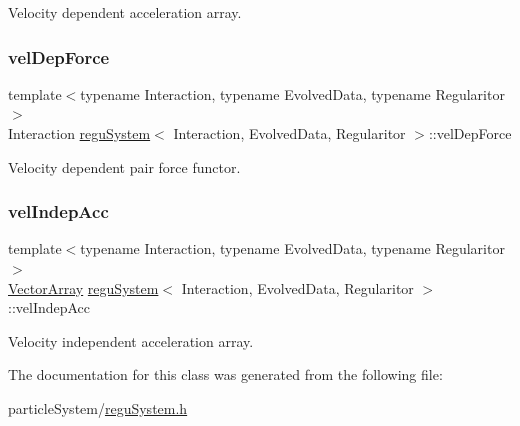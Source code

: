 Velocity dependent acceleration array. 

\mbox{\label{classregu_system_a9361c6c64c946570d6a71e3ab6ba74a0}} 
\subsubsection{\texorpdfstring{vel\+Dep\+Force}{velDepForce}}
{\footnotesize\ttfamily template$<$typename Interaction, typename Evolved\+Data, typename Regularitor$>$ \\
Interaction \mbox{\hyperlink{classregu_system}{regu\+System}}$<$ Interaction, Evolved\+Data, Regularitor $>$\+::vel\+Dep\+Force\hspace{0.3cm}{\ttfamily [private]}}



Velocity dependent pair force functor. 

\mbox{\label{classregu_system_afafcbf5f0c994cfe62d9fb8fb51023ab}} 
\subsubsection{\texorpdfstring{vel\+Indep\+Acc}{velIndepAcc}}
{\footnotesize\ttfamily template$<$typename Interaction, typename Evolved\+Data, typename Regularitor$>$ \\
\mbox{\hyperlink{classregu_system_aa4ecefb5c437230b994171e231450be8}{Vector\+Array}} \mbox{\hyperlink{classregu_system}{regu\+System}}$<$ Interaction, Evolved\+Data, Regularitor $>$\+::vel\+Indep\+Acc\hspace{0.3cm}{\ttfamily [private]}}



Velocity independent acceleration array. 



The documentation for this class was generated from the following file\+:\begin{DoxyCompactItemize}
\item 
particle\+System/\mbox{\hyperlink{regu_system_8h}{regu\+System.\+h}}\end{DoxyCompactItemize}
